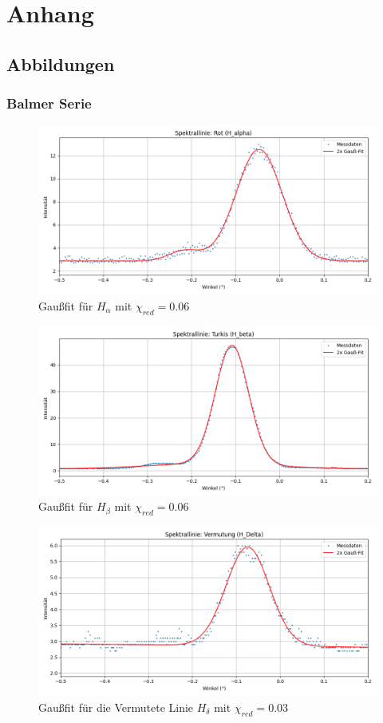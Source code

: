 \chapter{Anhang}
\section{Abbildungen}
\subsection*{Balmer Serie}

\begin{figure}[H]
\centering
\includegraphics[width=0.7\linewidth]{figs/dt_rot_155_62.png}
\caption{Gaußfit für $H_\alpha$ mit $\chi_{red} = 0.06$}
\label{fig:H_a}
\end{figure}

\begin{figure}[H]
\centering
\includegraphics[width=0.7\linewidth]{figs/dt_turkis_145_55_5.png}
\caption{Gaußfit für $H_\beta$ mit $\chi_{red} = 0.06$}
\label{fig:H_b}
\end{figure}

\begin{figure}[H]
\centering
\includegraphics[width=0.7\linewidth]{figs/dt_vermutung_145_49.png}
\caption{Gaußfit für die Vermutete Linie $H_\delta$ mit $\chi_{red} = 0.03$}
\label{fig:H_d}
\end{figure}

